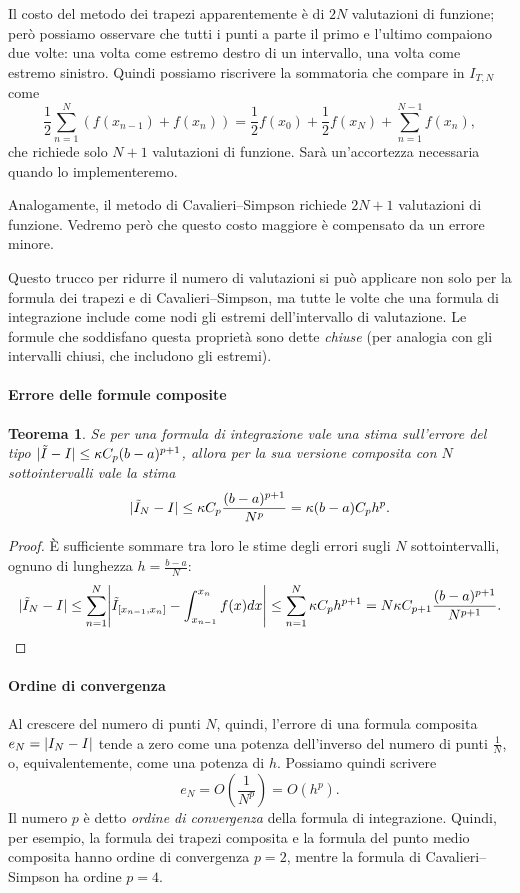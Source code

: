 \documentclass[a4paper]{report}
\DeclarePairedDelimiter{\abs}{\lvert}{\rvert}
\newtheorem{theorem}{Teorema}[chapter]
\theoremstyle{definiton}
\theoremstyle{remark}
\begin{document}
Il costo del metodo dei trapezi apparentemente è di $2N$ valutazioni di funzione; però possiamo osservare che tutti i punti a parte il primo e l'ultimo compaiono due volte: una volta come estremo destro di un intervallo, una volta come estremo sinistro. Quindi possiamo riscrivere la sommatoria che compare in $I_{T,N}$ come
\[
\frac12\sum_{n=1}^N\left(f(x_{n-1})+f(x_n)\right) = \frac12 f(x_0) + \frac12 f(x_N) + \sum_{n=1}^{N-1} f(x_n),
\]
che richiede solo $N+1$ valutazioni di funzione. Sarà un'accortezza necessaria quando lo implementeremo.

Analogamente, il metodo di Cavalieri--Simpson richiede $2N+1$ valutazioni di funzione. Vedremo però che questo costo maggiore è compensato da un errore minore.

Questo trucco per ridurre il numero di valutazioni si può applicare non solo per la formula dei trapezi e di Cavalieri--Simpson, ma tutte le volte che una formula di integrazione include come nodi gli estremi dell'intervallo di valutazione. Le formule che soddisfano questa proprietà sono dette \emph{chiuse} (per analogia con gli intervalli chiusi, che includono gli estremi).

\paragraph{Errore delle formule composite}

\begin{theorem}
Se per una formula di integrazione vale una stima sull'errore del tipo $\abs{\tilde{I} - I} \leq \kappa C_{p} (b-a)^{p+1}$, allora per la sua versione composita con $N$ sottointervalli vale la stima
\[
\abs{\tilde{I}_N - I} \leq \kappa C_{p} \frac{(b-a)^{p+1}}{N^{p}} = \kappa (b-a) C_{p}  h^{p}.
\]
\end{theorem}
\begin{proof}
È sufficiente sommare tra loro le stime degli errori sugli $N$ sottointervalli, ognuno di lunghezza $h=\frac{b-a}{N}$:
\begin{align*}
\abs{\tilde{I}_N - I} \leq \sum_{n=1}^N \abs*{\tilde{I}_{[x_{n-1},x_n]} -\int_{x_{n-1}}^{x_n} f(x)dx } \leq \sum_{n=1}^N \kappa C_{p} h^{p+1} =  N \kappa C_{p+1} \frac{(b-a)^{p+1}}{N^{p+1}}.
\end{align*}
\end{proof}

\paragraph{Ordine di convergenza} Al crescere del numero di punti $N$, quindi, l'errore di una formula composita $e_N = \abs{I_N - I}$ tende a zero come una potenza dell'inverso del numero di punti $\frac{1}{N}$, o, equivalentemente, come una potenza di $h$. Possiamo quindi scrivere
\[
e_N = O(\frac{1}{N^p}) = O(h^p).
\]
Il numero $p$ è detto \emph{ordine di convergenza} della formula di integrazione. Quindi, per esempio, la formula dei trapezi composita e la formula del punto medio composita hanno ordine di convergenza $p = 2$, mentre la formula di Cavalieri--Simpson ha ordine $p=4$. 
\end{document}
